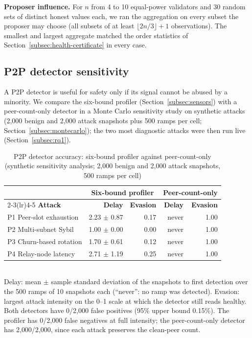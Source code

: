 \textbf{Proposer influence.} For $n$ from 4 to 10 equal-power validators and 30
random sets of distinct honest values each, we ran the aggregation on every
subset the proposer may choose (all subsets of at least $\lfloor 2n/3 \rfloor + 1$
observations). The smallest and largest aggregate matched the order statistics of
Section~\ref{subsec:health-certificate} in every case.

\subsection*{P2P detector sensitivity}

A P2P detector is useful for safety only if its
signal cannot be abused by a minority. We compare the six-bound
profiler (Section~\ref{subsec:sensors}) with a peer-count-only detector in a
Monte Carlo sensitivity study on synthetic attacks (2{,}000 benign and 2{,}000
attack snapshots plus 500 ramps per cell; Section~\ref{subsec:montecarlo}); the
two most diagnostic attacks were then run live (Section~\ref{subsec:rq1}).

\begin{table}[H]
\caption{P2P detector accuracy: six-bound profiler against peer-count-only
(synthetic sensitivity analysis; 2{,}000 benign and 2{,}000 attack snapshots, 500 ramps per cell)}
\label{tab:p2p-detector}
\centering
\footnotesize
\setlength{\tabcolsep}{3pt}
\begin{tabular}{@{}lrrrr@{}}
\toprule
 & \multicolumn{2}{c}{\textbf{Six-bound profiler}} & \multicolumn{2}{c}{\textbf{Peer-count-only}} \\
\cmidrule(lr){2-3}\cmidrule(lr){4-5}
\textbf{Attack} & \textbf{Delay} & \textbf{Evasion} & \textbf{Delay} & \textbf{Evasion} \\
\midrule
P1 Peer-slot exhaustion & 2.23 $\pm$ 0.87 & 0.17 & never & 1.00 \\
P2 Multi-subnet Sybil & 1.00 $\pm$ 0.00 & 0.00 & never & 1.00 \\
P3 Churn-based rotation & 1.70 $\pm$ 0.61 & 0.12 & never & 1.00 \\
P4 Relay-node latency & 2.71 $\pm$ 1.19 & 0.25 & never & 1.00 \\
\bottomrule
\end{tabular}
\\[2pt]
\footnotesize Delay: mean $\pm$ sample standard deviation of the snapshots to
first detection over the 500 ramps of 10 snapshots each (``never'': no ramp
was detected). Evasion: largest attack intensity on
the 0--1 scale at which the detector still reads healthy. Both detectors have
0/2{,}000 false positives (95\% upper bound 0.15\%). The profiler has 0/2{,}000
false negatives at full intensity; the peer-count-only detector has
2{,}000/2{,}000, since each attack preserves the clean-peer count.
\end{table}

